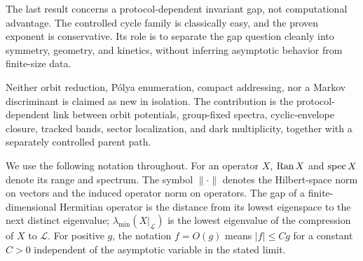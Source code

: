 The last result concerns a protocol-dependent invariant gap, not computational
advantage.  The controlled cycle family is classically easy, and the proven
exponent is conservative.  Its role is to separate the gap question cleanly
into symmetry, geometry, and kinetics, without inferring asymptotic behavior
from finite-size data.

Neither orbit reduction, P\'olya enumeration, compact addressing, nor a
Markov discriminant is claimed as new in isolation.  The contribution is
the protocol-dependent link between orbit potentials, group-fixed spectra,
cyclic-envelope closure, tracked bands, sector localization, and dark
multiplicity, together with a separately controlled parent path.

We use the following notation throughout.  For an operator $X$,
$\operatorname{Ran} X$ and $\operatorname{spec} X$ denote its range and spectrum.  The symbol
$\|\cdot\|$ denotes the Hilbert-space norm on vectors and the induced
operator norm on operators.  The gap of a finite-dimensional Hermitian
operator is the distance from its lowest eigenspace to the next distinct
eigenvalue; $\lambda_{\min}(X|_{\mathcal L})$ is the lowest eigenvalue of
the compression of $X$ to $\mathcal L$.  For positive $g$, the notation
$f=O(g)$ means $|f|\leq Cg$ for a constant $C>0$ independent of the
asymptotic variable in the stated limit.
